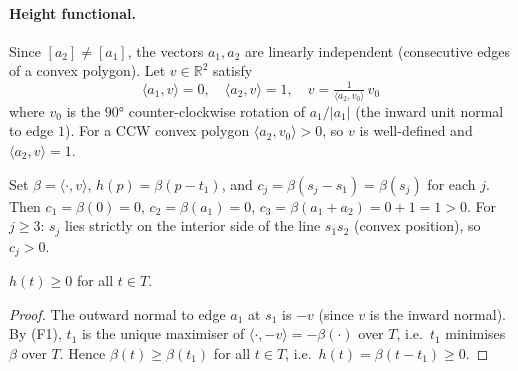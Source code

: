 \paragraph{Height functional.}
Since $[a_2]\ne[a_1]$, the vectors $a_1,a_2$ are linearly independent (consecutive
edges of a convex polygon).  Let $v\in\mathbb{R}^2$ satisfy
\[
  \langle a_1,v\rangle=0,\quad \langle a_2,v\rangle=1,
  \quad v=\tfrac{1}{\langle a_2,v_0\rangle}\,v_0
\]
where $v_0$ is the $90°$ counter-clockwise rotation of $a_1/|a_1|$
(the inward unit normal to edge $1$).
For a CCW convex polygon $\langle a_2,v_0\rangle>0$, so $v$ is well-defined and
$\langle a_2,v\rangle=1$.

Set $\beta=\langle\cdot,v\rangle$, $h(p)=\beta(p-t_1)$, and $c_j=\beta(s_j-s_1)=\beta(s_j)$ for each $j$.
Then $c_1=\beta(0)=0$, $c_2=\beta(a_1)=0$, $c_3=\beta(a_1+a_2)=0+1=1>0$.
For $j\ge3$: $s_j$ lies strictly on the interior side of the line $s_1s_2$
(convex position), so $c_j>0$.

\begin{lemma}[betamin]\label{lem:betamin}
$h(t)\ge0$ for all $t\in T$.
\end{lemma}
\begin{proof}
The outward normal to edge $a_1$ at $s_1$ is $-v$ (since $v$ is the inward normal).
By (F1), $t_1$ is the unique maximiser of $\langle\cdot,-v\rangle=-\beta(\cdot)$ over $T$,
i.e.\ $t_1$ minimises $\beta$ over $T$.
Hence $\beta(t)\ge\beta(t_1)$ for all $t\in T$, i.e.\ $h(t)=\beta(t-t_1)\ge0$.
\end{proof}

